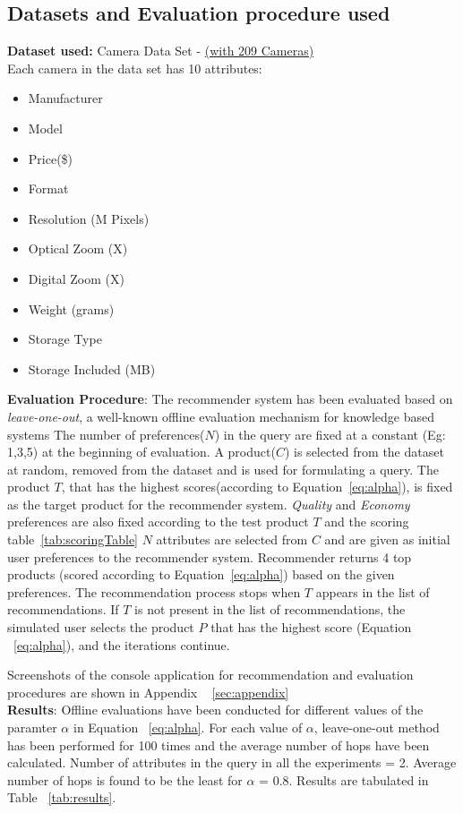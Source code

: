 \documentclass{llncs}
\begin{document}
\subsection{Datasets and Evaluation procedure used}
\label{sec:evaluationProcedure}
\textbf{Dataset used:}
Camera Data Set - \href{http://josquin.cs.depaul.edu/~rburke/research/downloads/camera.zip}{(with 209 Cameras)} \\
Each camera in the data set has 10 attributes:
\renewcommand{\labelitemi}{$\bullet$}
\begin{multicols}{2}
\begin{itemize}
\item Manufacturer
\item Model
\item Price(\$)
\item Format
\item Resolution (M Pixels)
\item Optical Zoom (X)
\item Digital Zoom (X)
\item Weight (grams)
\item Storage Type
\item Storage Included (MB)
\end{itemize}
\end{multicols}
\textbf{Evaluation Procedure}:
The recommender system has been evaluated based on \textit{leave-one-out}, a well-known offline evaluation mechanism for knowledge based systems
The number of preferences($N$) in the query are fixed at a constant (Eg: 1,3,5) at the beginning of evaluation.
A product($C$) is selected from the dataset at random, removed from the dataset and is used for formulating a query.
The product $T$, that has the highest scores(according to Equation~\ref{eq:alpha}), is fixed as the target product for the recommender system.
\textit{Quality} and \textit{Economy} preferences are also fixed according to the test product $T$ and the scoring table~\ref{tab:scoringTable}
$N$ attributes are selected from $C$ and are given as initial user preferences to the recommender system.
Recommender returns 4 top products (scored according to Equation~\ref{eq:alpha}) based on the given preferences.
The recommendation process stops when $T$ appears in the list of recommendations.
If $T$ is not present in the list of recommendations, the simulated user selects the product $P$ that has the highest score (Equation ~\ref{eq:alpha}), and the iterations continue.

Screenshots of the console application for recommendation and evaluation procedures are shown in Appendix ~ \ref{sec:appendix}\\
\textbf{Results}:
Offline evaluations have been conducted for different values of the paramter $\alpha$ in Equation ~\ref{eq:alpha}.
For each value of $\alpha$, leave-one-out method has been performed for 100 times and the average number of hops have been calculated.
Number of attributes in the query in all the experiments = 2. Average number of hops is found to be the least for $\alpha$ = 0.8.
Results are tabulated in Table ~\ref{tab:results}.
\end{document}
